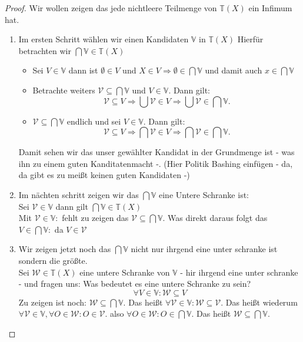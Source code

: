 \begin{proof}
  Wir wollen zeigen das jede nichtleere Teilmenge von $\mathbb{T}(X)$ ein Infimum hat.
 \begin{enumerate}
    \item Im ersten Schritt wählen wir einen Kandidaten  $\mathbb{V}$ in $\mathbb{T}(X)$ 
    Hierfür betrachten wir $\bigcap \mathbb{V} \in \mathbb{T}(X)$
    \begin{itemize}
      \item Sei $V \in \mathbb{V}$ dann ist 
      $\emptyset \in V$ und $X \in V \Rightarrow \emptyset \in \bigcap \mathbb{V}$
      und damit auch $x \in \bigcap \mathbb{V}$ 
      \item Betrachte weiters $\mathcal{V} \subseteq \bigcap \mathbb{V}$ und $V \in \mathbb{V}$. 
      Dann gilt:
      $$ 
      \mathcal{V} \subseteq V \Rightarrow \bigcup \mathcal{V} \in V \Rightarrow \bigcup \mathcal{V} \in \bigcap \mathbb{V}.
      $$
      \item
      $\mathcal{V} \subseteq \bigcap \mathbb{V}$ endlich und sei $V \in \mathbb{V}$. 
      Dann gilt:
      $$ 
      \mathcal{V} \subseteq V \Rightarrow \bigcap \mathcal{V} \in V \Rightarrow \bigcap \mathcal{V} \in \bigcap \mathbb{V}.
      $$
    \end{itemize}
    Damit sehen wir das unser gewählter Kandidat in der Grundmenge ist - was ihn zu einem guten Kanditatenmacht -.
    (Hier Politik Bashing einfügen - da, da gibt es zu meißt keinen guten  Kandidaten -) 

    \item Im nächten schritt zeigen wir das $\bigcap \mathbb{V}$ eine Untere Schranke ist:\\
   Sei $\mathcal{V}  \in \mathbb{V} $ dann gilt $\bigcap \mathbb{V} \in \mathbb{T}(X)$ \\
   Mit  $\mathcal{V}  \in \mathbb{V} :$ fehlt zu zeigen das $\mathcal{V} \subseteq \bigcap \mathbb{V}$.
   Was direkt daraus folgt das $V \in \bigcap \mathbb{V} :$ da $V \in \mathcal{V}$

    \item Wir zeigen jetzt noch das $\bigcap \mathbb{V}$ nicht nur ihrgend eine unter schranke ist
    sondern die größte.\\
    Sei $\mathcal{W} \in \mathbb{T}(X)$ eine untere Schranke von $\mathbb{V}$
     - hir ihrgend eine unter schranke - und fragen uns:
    Was bedeutet es eine untere Schranke zu sein?
    $$\forall V \in \mathbb{V}: \mathcal{W} \subseteq V$$
    Zu zeigen ist noch: $\mathcal{W} \subseteq \bigcap \mathbb{V}$.
    Das heißt $\forall \mathcal{V} \in \mathbb{V}: \mathcal{W} \subseteq \mathcal{V}$.
    Das heißt wiederum $\forall \mathcal{V} \in \mathbb{V}, \forall O \in \mathcal{W}: O \in \mathcal{V}$.
    also $\forall O \in \mathcal{W}: O \in \bigcap \mathbb{V}$.
    Das heißt $\mathcal{W} \subseteq \bigcap \mathbb{V}$.
  \end{enumerate}
\end{proof}


